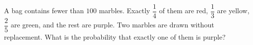 A bag contains fewer than $100$ marbles. Exactly $\dfrac14$ of them are red, $\dfrac13$ are yellow, $\dfrac25$ are green, and the rest are purple. Two marbles are drawn without replacement. What is the probability that exactly one of them is purple?
